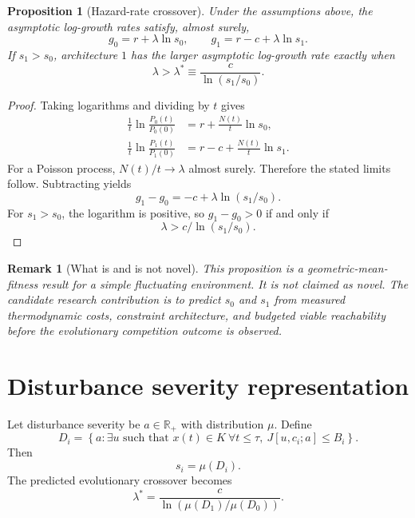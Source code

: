 \documentclass[11pt]{article}
\newtheorem{proposition}{Proposition}
\newtheorem{remark}{Remark}
\begin{document}
\begin{proposition}[Hazard-rate crossover]
Under the assumptions above, the asymptotic log-growth rates satisfy, almost surely,
\begin{equation}
    g_0=r+\lambda\ln s_0,
    \qquad
    g_1=r-c+\lambda\ln s_1.
\end{equation}
If $s_1>s_0$, architecture $1$ has the larger asymptotic log-growth rate exactly when
\begin{equation}
    \lambda>\lambda^*\equiv\frac{c}{\ln(s_1/s_0)}.
\end{equation}
\end{proposition}

\begin{proof}
Taking logarithms and dividing by $t$ gives
\begin{align}
\frac{1}{t}\ln\frac{P_0(t)}{P_0(0)}
&=r+\frac{N(t)}{t}\ln s_0,\\
\frac{1}{t}\ln\frac{P_1(t)}{P_1(0)}
&=r-c+\frac{N(t)}{t}\ln s_1.
\end{align}
For a Poisson process, $N(t)/t\to\lambda$ almost surely. Therefore the stated limits follow. Subtracting yields
\begin{equation}
    g_1-g_0=-c+\lambda\ln(s_1/s_0).
\end{equation}
For $s_1>s_0$, the logarithm is positive, so $g_1-g_0>0$ if and only if
\begin{equation}
    \lambda>c/\ln(s_1/s_0).
\end{equation}
\end{proof}

\begin{remark}[What is and is not novel]
This proposition is a geometric-mean-fitness result for a simple fluctuating environment. It is not claimed as novel. The candidate research contribution is to predict $s_0$ and $s_1$ from measured thermodynamic costs, constraint architecture, and budgeted viable reachability before the evolutionary competition outcome is observed.
\end{remark}

\section{Disturbance severity representation}

Let disturbance severity be $a\in\mathbb{R}_+$ with distribution $\mu$. Define
\begin{equation}
D_i=\left\{a:\exists u\text{ such that }x(t)\in K\ \forall t\le\tau,\ J[u,c_i;a]\le B_i\right\}.
\end{equation}
Then
\begin{equation}
    s_i=\mu(D_i).
\end{equation}
The predicted evolutionary crossover becomes
\begin{equation}
    \lambda^*=\frac{c}{\ln\left(\mu(D_1)/\mu(D_0)\right)}.
\end{equation}
\end{document}
